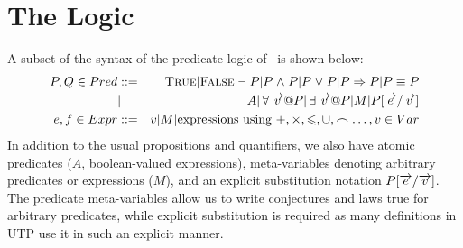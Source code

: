 \section{The Logic}
\label{sec:logic:foundation}



%
%

A subset of the syntax of the predicate logic of \STHN\ is
shown below:
  \begin{eqnarray*}
    P,Q \in Pred &::=&  \True | \False | \lnot P | P \land P | P \lor P | P \implies P | P \equiv P
  \\           & | & A | \forall \lst v @ P | \exists \lst v @ P
                       | M | P[\lst e/\lst v]
  \\ e,f \in Expr &::=& v | M | \mbox{expressions using }+,\times,\le,\cup,\cat \ldots, v \in Var
  \end{eqnarray*}
In addition to the usual propositions and quantifiers,
we also have atomic predicates ($A$, boolean-valued expressions),
meta-variables denoting arbitrary predicates or expressions ($M$),
and an explicit substitution notation $P[\overrightarrow{e}/\overrightarrow{v}]$.
The predicate meta-variables allow us to write conjectures and laws true for
arbitrary predicates,
while explicit substitution is required
as many definitions in UTP use it in such an explicit manner.


